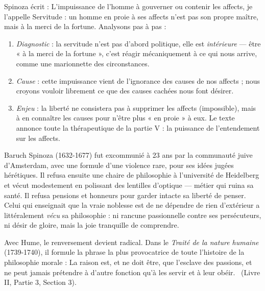 \documentclass[11pt]{article}
\newcounter{popsec}
\newcounter{popsub}
\newcommand{\courssub}[1]{%
  \stepcounter{popsub}%
  \par\vspace{9pt}\noindent{\popxbold\fontsize{11.5}{13}\selectfont\color{popink}{\color{poporange}\thepopsec.\thepopsub}\hspace{6pt}#1}\par\nopagebreak\vspace{4pt}
}
\begin{document}
\begin{experience}
Spinoza écrit : \guillemotleft L'impuissance de l'homme à gouverner ou contenir les affects, je l'appelle Servitude : un homme en proie à ses affects n'est pas son propre maître, mais à la merci de la fortune. \guillemotright
Analysons pas à pas :
\begin{enumerate}
\item \emph{Diagnostic} : la servitude n'est pas d'abord politique, elle est \emph{intérieure} — être « à la merci de la fortune », c'est réagir mécaniquement à ce qui nous arrive, comme une marionnette des circonstances.
\item \emph{Cause} : cette impuissance vient de l'ignorance des causes de nos affects ; nous croyons vouloir librement ce que des causes cachées nous font désirer.
\item \emph{Enjeu} : la liberté ne consistera pas à supprimer les affects (impossible), mais à en connaître les causes pour n'être plus « en proie » à eux. Le texte annonce toute la thérapeutique de la partie V : la puissance de l'entendement sur les affects.
\end{enumerate}
\end{experience}

\begin{savaistu}
Baruch Spinoza (1632-1677) fut excommunié à 23 ans par la communauté juive d'Amsterdam, avec une formule d'une violence rare, pour ses idées jugées hérétiques. Il refusa ensuite une chaire de philosophie à l'université de Heidelberg et vécut modestement en polissant des lentilles d'optique — métier qui ruina sa santé. Il refusa pensions et honneurs pour garder intacte sa liberté de penser. Celui qui enseignait que la vraie noblesse est de ne dépendre de rien d'extérieur a littéralement \emph{vécu} sa philosophie : ni rancune passionnelle contre ses persécuteurs, ni désir de gloire, mais la joie tranquille de comprendre.
\end{savaistu}

\courssub{Hume : la raison, esclave des passions}

Avec Hume, le renversement devient radical. Dans le \emph{Traité de la nature humaine} (1739-1740), il formule la phrase la plus provocatrice de toute l'histoire de la philosophie morale : \guillemotleft La raison est, et ne doit être, que l'esclave des passions, et ne peut jamais prétendre à d'autre fonction qu'à les servir et à leur obéir. \guillemotright\ (Livre II, Partie 3, Section 3).
\end{document}
